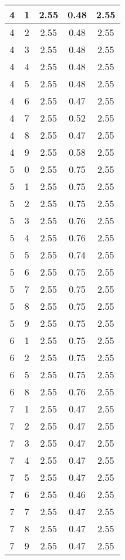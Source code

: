 \begin{longtable}{|c|c||c||c||c|}
	4 & 1 & 2.55 & 0.48 & 2.55 \\ \hline
	4 & 2 & 2.55 & 0.48 & 2.55 \\ \hline
	4 & 3 & 2.55 & 0.48 & 2.55 \\ \hline
	4 & 4 & 2.55 & 0.48 & 2.55 \\ \hline
	4 & 5 & 2.55 & 0.48 & 2.55 \\ \hline
	4 & 6 & 2.55 & 0.47 & 2.55 \\ \hline
	4 & 7 & 2.55 & 0.52 & 2.55 \\ \hline
	4 & 8 & 2.55 & 0.47 & 2.55 \\ \hline
	4 & 9 & 2.55 & 0.58 & 2.55 \\ \hline
	5 & 0 & 2.55 & 0.75 & 2.55 \\ \hline
	5 & 1 & 2.55 & 0.75 & 2.55 \\ \hline
	5 & 2 & 2.55 & 0.75 & 2.55 \\ \hline
	5 & 3 & 2.55 & 0.76 & 2.55 \\ \hline
	5 & 4 & 2.55 & 0.76 & 2.55 \\ \hline
	5 & 5 & 2.55 & 0.74 & 2.55 \\ \hline
	5 & 6 & 2.55 & 0.75 & 2.55 \\ \hline
	5 & 7 & 2.55 & 0.75 & 2.55 \\ \hline
	5 & 8 & 2.55 & 0.75 & 2.55 \\ \hline
	5 & 9 & 2.55 & 0.75 & 2.55 \\ \hline
	6 & 1 & 2.55 & 0.75 & 2.55 \\ \hline
	6 & 2 & 2.55 & 0.75 & 2.55 \\ \hline
	6 & 5 & 2.55 & 0.75 & 2.55 \\ \hline
	6 & 8 & 2.55 & 0.76 & 2.55 \\ \hline
	7 & 1 & 2.55 & 0.47 & 2.55 \\ \hline
	7 & 2 & 2.55 & 0.47 & 2.55 \\ \hline
	7 & 3 & 2.55 & 0.47 & 2.55 \\ \hline
	7 & 4 & 2.55 & 0.47 & 2.55 \\ \hline
	7 & 5 & 2.55 & 0.47 & 2.55 \\ \hline
	7 & 6 & 2.55 & 0.46 & 2.55 \\ \hline
	7 & 7 & 2.55 & 0.47 & 2.55 \\ \hline
	7 & 8 & 2.55 & 0.47 & 2.55 \\ \hline
	7 & 9 & 2.55 & 0.47 & 2.55 \\ \hline
\end{longtable}
\clearpage{}
